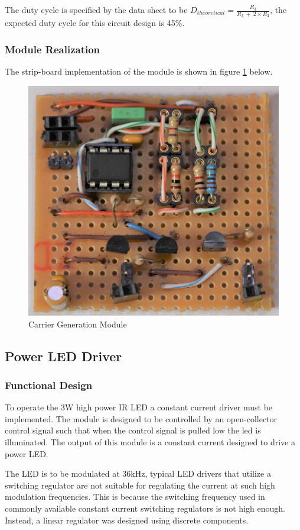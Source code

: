 The duty cycle is specified by the data sheet to be \(D_{theoretical} = \frac{R_3}{R_2\: +\: 2\times R_3}\), the expected duty cycle for this circuit design is 45\%.

\subsubsection{Module Realization}
The strip-board implementation of the module is shown in figure \ref{fig:module_carrier_generation} below.

\begin{figure}[H]
	\centering
	\includegraphics[width=.6\textwidth]{figures/modules/carrier_generator.jpg}
	\caption{Carrier Generation Module}
	\label{fig:module_carrier_generation}
\end{figure}






\subsection{Power LED Driver}

\subsubsection{Functional Design}
To operate the 3W high power IR LED a constant current driver must be implemented. The module is designed to be controlled by an open-collector control signal such that when the control signal is pulled low the led is illuminated. The output of this module is a constant current designed to drive a power LED.

The LED is to be modulated at 36kHz, typical LED drivers that utilize a switching regulator are not suitable for regulating the current at such high modulation frequencies. This is because the switching frequency used in commonly available constant current switching regulators is not high enough. Instead, a linear regulator was designed using discrete components.

